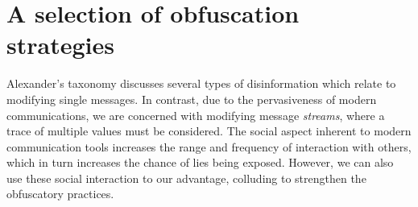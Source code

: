 \documentclass{IOS-Book-Article}     %
\begin{document}







\section{A selection of obfuscation strategies}
\label{sec:strategies}

Alexander's taxonomy \cite{alexander2010Disinformation} discusses several types
of disinformation which relate to modifying single messages. In contrast, due to
the pervasiveness of modern communications, we are concerned with modifying
message \emph{streams}, where a trace of multiple values must be considered.
The social aspect inherent to modern communication tools increases the 
range and frequency of interaction with others, which in turn increases the 
chance of lies being exposed.
However, we can also use these social interaction to our advantage, colluding to
strengthen the obfuscatory practices. %
\end{document}
